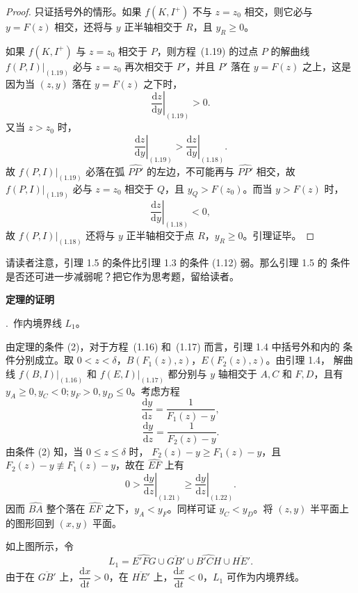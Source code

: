 \begin{proof}
只证括号外的情形。如果 $f(K,I^+)$ 不与 $z=z_0$ 相交，则它必与
$y=F(z)$ 相交，还将与 $y$ 正半轴相交于 $R$，且 $y_R\geq0$。

如果 $f(K,I^+)$ 与 $z=z_0$ 相交于 $P$，则方程~(1.19) 的过点 $P$ 的解曲线
$f(P,I)|_{(1.19)}$ 必与 $z=z_0$ 再次相交于 $P'$，并且 $P'$ 落在
$y=F(z)$ 之上，这是因为当 $(z,y)$ 落在 $y=F(z)$ 之下时，
\[
  \left.\dfrac{\mathrm{d}z}{\mathrm{d}y}\right|_{(1.19)}>0.
\]
又当 $z>z_0$ 时，
\[
  \left.\dfrac{\mathrm{d}z}{\mathrm{d}y}\right|_{(1.19)}
  >\left.\dfrac{\mathrm{d}z}{\mathrm{d}y}\right|_{(1.18)}.
\]
故 $f(P,I)|_{(1.19)}$ 必落在弧 $\widehat{PP'}$ 的左边，不可能再与
$\widehat{PP'}$ 相交，故 $f(P,I)|_{(1.19)}$ 必与 $z=z_0$ 相交于 $Q$，且
$y_Q>F(z_0)$。而当 $y>F(z)$ 时，
\[
  \left.\dfrac{\mathrm{d}z}{\mathrm{d}y}\right|_{(1.18)}<0,
\]
故 $f(P,I)|_{(1.18)}$ 还将与 $y$ 正半轴相交于点 $R$，$y_R\geq0$。引理证毕。
\end{proof}

请读者注意，引理 1.5 的条件比引理 1.3 的条件 (1.12) 弱。那么引理 1.5 的
条件是否还可进一步减弱呢？把它作为思考题，留给读者。


\noindent\textbf{定理的证明}

.~作内境界线 $L_1$。

由定理的条件 (2)，对于方程~(1.16) 和~(1.17) 而言，引理 1.4 中括号外和内的
条件分别成立。取 $0<z<\delta$，$B(F_1(z),z)$，$E(F_2(z),z)$。由引理 1.4，
解曲线 $f(B,I)|_{(1.16)}$ 和 $f(E,I)|_{(1.17)}$ 都分别与 $y$ 轴相交于
$A,C$ 和 $F,D$，且有 $y_A\geq0,y_C<0;y_F>0,y_D\leq0$。考虑方程
\[
  \dfrac{\mathrm{d}y}{\mathrm{d}z}=\dfrac1{F_1(z)-y}, \tag{1.21}
\]
\[
  \dfrac{\mathrm{d}y}{\mathrm{d}z}=\dfrac1{F_2(z)-y}. \tag{1.22}
\]
由条件 (2) 知，当 $0\leq z\leq\delta$ 时，
$F_2(z)-y\geq F_1(z)-y$，且 $F_2(z)-y\not\equiv F_1(z)-y$，故在
$\widehat{EF}$ 上有
\[
  0>\left.\dfrac{\mathrm{d}y}{\mathrm{d}z}\right|_{(1.21)}
  \geq\left.\dfrac{\mathrm{d}y}{\mathrm{d}z}\right|_{(1.22)}.
\]
因而 $\widehat{BA}$ 整个落在 $\widehat{EF}$ 之下，$y_A<y_F$。同样可证
$y_C<y_D$。将 $(z,y)$ 半平面上的图形回到 $(x,y)$ 平面。


如上图所示，令
\[
  L_1=\widehat{E'FG}\cup\overline{GB'}\cup\widehat{B'CH}
  \cup\overline{HE'}.
\]
由于在 $\overline{GB'}$ 上，$\dfrac{\mathrm{d}x}{\mathrm{d}t}>0$，在
$\overline{HE'}$ 上，$\dfrac{\mathrm{d}x}{\mathrm{d}t}<0$，$L_1$ 可作为内境界线。

